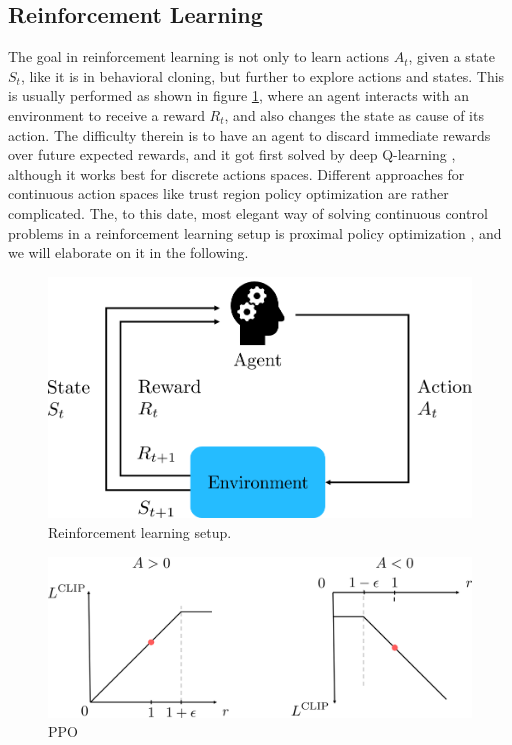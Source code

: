 \subsection{Reinforcement Learning}
\label{sec::323_rl}
The goal in reinforcement learning is not only to learn actions $A_t$, given a state $S_t$, like it is in behavioral cloning, but further to explore actions and states. This is usually performed as shown in figure \ref{fig::323_rl}, where an agent interacts with an environment to receive a reward $R_t$, and also changes the state as cause of its action. The difficulty therein is to have an agent to discard immediate rewards over future expected rewards, and it got first solved by deep Q-learning \cite{mnih2015human}, although it works best for discrete actions spaces. Different approaches for continuous action spaces like trust region policy optimization \cite{schulman2015trust} are rather complicated. The, to this date, most elegant way of solving continuous control problems in a reinforcement learning setup is proximal policy optimization \cite{schulman2017proximal}, and we will elaborate on it in the following. 




\cite{schulman2015high}



\begin{figure}[h]
	\centering
	\includegraphics[scale=.5]{chapters/03_background/img/reinforcement_learning.png}
	\caption{Reinforcement learning setup.}
	\label{fig::323_rl}
\end{figure}
\begin{figure}[h]
	\centering
	\includegraphics[scale=.35]{chapters/03_background/img/ppo_objective.png}
	\caption{PPO}
	\label{fig::323_ppo}
\end{figure}